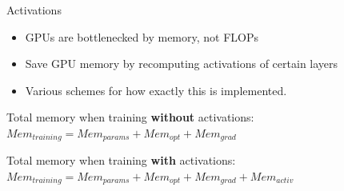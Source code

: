 \documentclass[11pt,compress,t,notes=noshow, xcolor=table]{beamer}
\begin{document}

\begin{vbframe}{Activations}

\vfill

\begin{itemize}
 	\item GPUs are bottlenecked by memory, not FLOPs
 	\item Save GPU memory by recomputing activations of certain layers
	\item Various schemes for how exactly this is implemented.
\end{itemize}

\vskip5mm

Total memory when training \textbf{without} activations: \newline
$Mem_{training} = Mem_{params} + Mem_{opt} + Mem_{grad}$

\vskip5mm

Total memory when training \textbf{with} activations: \newline
$Mem_{training} = Mem_{params} + Mem_{opt} + Mem_{grad} + Mem_{activ}$

\vskip5mm


\vfill

\end{vbframe}


\endlecture
\end{document}
